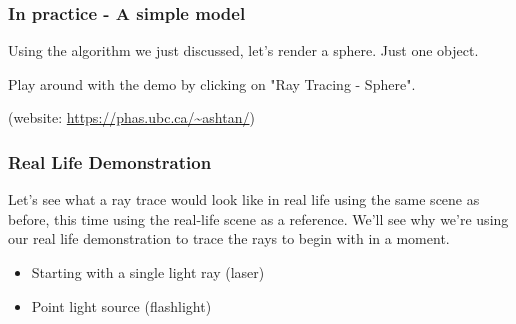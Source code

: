 \documentclass[12pt]{beamer}
\begin{document}
  \begin{frame}
    \frametitle{In practice - A simple model}


    Using the algorithm we just discussed, let's render a sphere. Just one object.

    \hfill


    Play around with the demo by clicking on "Ray Tracing - Sphere".

    \hfill

    (website: \url{https://phas.ubc.ca/~ashtan/})



  \end{frame}

  \begin{frame}
    \frametitle{Real Life Demonstration}

    Let's see what a ray trace would look like in real life using the same scene as before, this time using the real-life scene as a reference.
    We'll see why we're using our real life demonstration to trace the rays to begin with in a moment.


    \begin{itemize}
      \item Starting with a single light ray (laser)
      \item Point light source (flashlight)
    \end{itemize}

  \end{frame}
\end{document}
